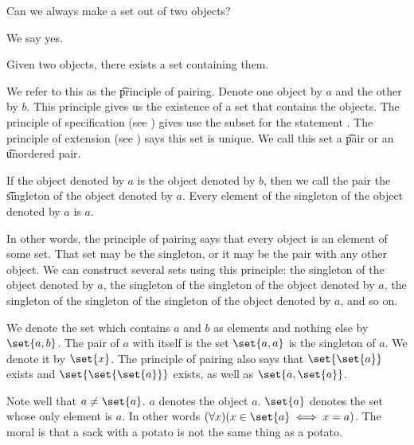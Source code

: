 

Can we always make a set out of two objects?


We say yes.
\begin{principle}[Pairing]
	Given two objects, there exists a set containing them.
\end{principle}
We refer to this as the \t{principle of pairing}.
Denote one object by $a$ and the other by $b$.
This principle gives us the existence of a set that contains the objects.
The principle of specification (see ) gives use the subset for the statement .
The principle of extension (see ) says this set is unique.
We call this set a \t{pair} or an \t{unordered pair}.

If the object denoted by $a$ is the object denoted by $b$, then we call the pair the \t{singleton} of the object denoted by $a$.
Every element of the singleton of the object denoted by $a$ is $a$.\

In other words, the principle of pairing says that every object is an element of some set.
That set may be the singleton, or it may be the pair with any other object.
We can construct several sets using this principle: the singleton of the object denoted by $a$, the singleton of the singleton of the object denoted by $a$, the singleton of the singleton of the singleton of the object denoted by $a$, and so on.


We denote the set which contains $a$ and $b$ as elements and nothing else by $\set{a, b}$.
The pair of $a$ with itself is the set $\set{a, a}$ is the singleton of $a$.
We denote it by $\set{x}$.
The principle of pairing also says that $\set{\set{a}}$ exists and $\set{\set{\set{a}}}$ exists, as well as $\set{a, \set{a}}$.

Note well that $a \neq \set{a}$.
$a$ denotes the object $a$.
$\set{a}$ denotes the set whose only element is $a$.
In other words $(\forall x)(x \in \set{a} \iff x = a)$.
The moral is that a sack with a potato is not the same thing as a potato.